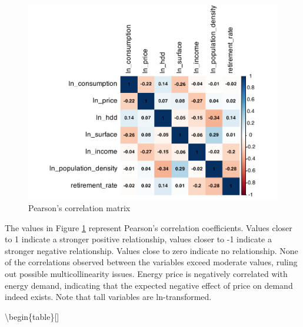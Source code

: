 \documentclass[12pt,twoside]{reedthesis}
\begin{document}
\newpage
\begin{figure}

{\centering \includegraphics[width=0.9\linewidth]{figure/correlation_matrix} 

}

\caption{Pearson’s correlation matrix}\label{fig:correlation-plot}
\end{figure}
The values in Figure \ref{fig:correlation-plot} represent Pearson's correlation coefficients. Values closer to 1 indicate a stronger positive relationship, values closer to -1 indicate a stronger negative relationship. Values close to zero indicate no relationship. None of the correlations observed between the variables exceed moderate values, ruling out possible multicollinearity issues. Energy price is negatively correlated with energy demand, indicating that the expected negative effect of price on demand indeed exists. Note that tall variables are ln-transformed.

\newpage

\textbackslash begin\{table\}{[}{]}
\centering
\end{document}
